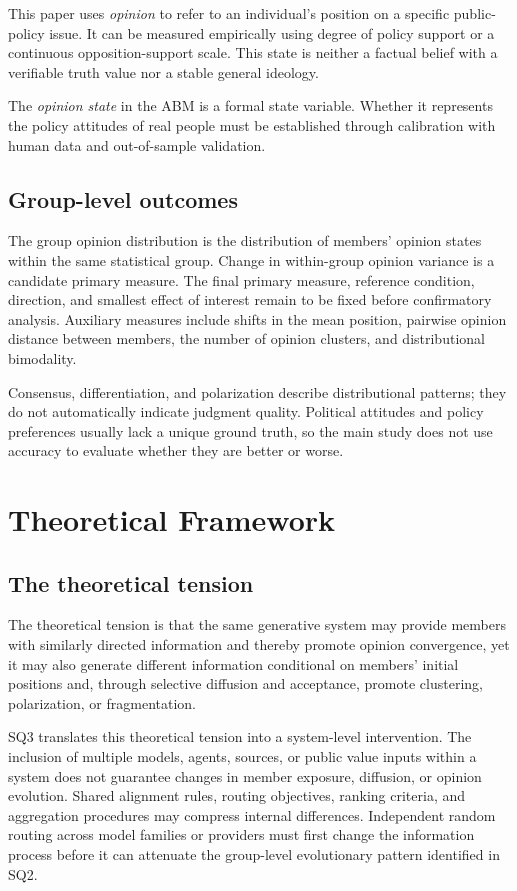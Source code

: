 \documentclass[11pt,a4paper]{article}
\newcommand{\term}[1]{\textit{#1}}
\begin{document}
This paper uses \term{opinion} to refer to an individual's position on a specific public-policy issue. It can be measured empirically using degree of policy support or a continuous opposition-support scale. This state is neither a factual belief with a verifiable truth value nor a stable general ideology.

The \term{opinion state} in the ABM is a formal state variable. Whether it represents the policy attitudes of real people must be established through calibration with human data and out-of-sample validation.

\subsection{Group-level outcomes}

The group opinion distribution is the distribution of members' opinion states within the same statistical group. Change in within-group opinion variance is a candidate primary measure. The final primary measure, reference condition, direction, and smallest effect of interest remain to be fixed before confirmatory analysis. Auxiliary measures include shifts in the mean position, pairwise opinion distance between members, the number of opinion clusters, and distributional bimodality.

Consensus, differentiation, and polarization describe distributional patterns; they do not automatically indicate judgment quality. Political attitudes and policy preferences usually lack a unique ground truth, so the main study does not use accuracy to evaluate whether they are better or worse.

\section{Theoretical Framework}

\subsection{The theoretical tension}

The theoretical tension is that the same generative system may provide members with similarly directed information and thereby promote opinion convergence, yet it may also generate different information conditional on members' initial positions and, through selective diffusion and acceptance, promote clustering, polarization, or fragmentation.

SQ3 translates this theoretical tension into a system-level intervention. The inclusion of multiple models, agents, sources, or public value inputs within a system does not guarantee changes in member exposure, diffusion, or opinion evolution. Shared alignment rules, routing objectives, ranking criteria, and aggregation procedures may compress internal differences. Independent random routing across model families or providers must first change the information process before it can attenuate the group-level evolutionary pattern identified in SQ2.
\end{document}
